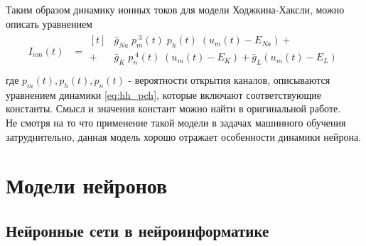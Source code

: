 \documentclass[a4paper,10pt]{article}
\begin{document}
	\indent Таким образом динамику ионных токов для модели Ходжкина-Хаксли, можно описать уравнением
	\begin{align}\label{eq:hh_ion}
	I_{ion}(t) &= \begin{aligned}[t]
	&\bar{g}_{Na}\;p_{m}^{\;3}(t)\;p_{h}(t)\;(u_{m}(t)-E_{Na}) +	\\
	+\;&\bar{g}_{K}\;p_{n}^{\;4}(t)\;(u_{m}(t)-E_{K})+\bar{g}_{L}(u_{m}(t)-E_{L})	\\
	\end{aligned}
	\end{align}
	где $p_{m}(t), p_{h}(t), p_{n}(t)$ - вероятности открытия каналов, описываются уравнением динамики \eqref{eq:hh_pch}, которые включают соответствующие константы. Смысл и значения констант можно найти в оригинальной работе\cite{HH}.\\
	\indent Не смотря на то что применение такой модели в задачах машинного обучения затруднительно, данная модель хорошо отражает особенности динамики нейрона.

\section{Модели нейронов}
\subsection{Нейронные сети в нейроинформатике}
\end{document}
